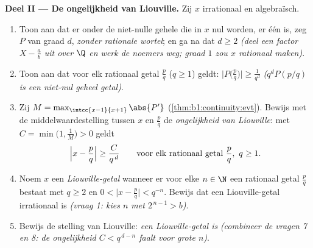 \begin{problem}
\medskip
\noindent\textbf{Deel II --- De ongelijkheid van Liouville.} Zij
$x$ irrationaal en algebraïsch.
\begin{enumerate}[resume]
  \item Toon aan dat er onder de niet-nulle gehele  die
        in $x$ nul worden, er één is, zeg $P$ van graad $d$,
        \emph{zonder rationale wortel}; en ga na dat $d \geq 2$
        \emph{(deel een factor $X - \frac ab$ uit over $\Q$ en
        werk de noemers weg; graad $1$ zou $x$ rationaal maken)}.
  \item Toon aan dat voor elk rationaal getal $\frac pq$ ($q \geq
        1$) geldt: $\bigl|P\bigl(\frac pq\bigr)\bigr| \geq
        \frac{1}{q^d}$ \emph{($q^d P(p/q)$ is een niet-nul geheel
        getal)}.
  \item Zij $M = \max_{\intcc{x-1}{x+1}} \abs{P'}$
        (\cref{thm:b1:continuity:evt}). Bewijs met de
        middelwaardestelling tussen $x$ en $\frac pq$ de
        \emph{ongelijkheid van Liouville}: met $C = \min\bigl(1,
        \frac 1M\bigr) > 0$ geldt
        \[
        \Bigl| x - \frac pq \Bigr| \geq \frac{C}{q^{\,d}}
        \qquad\text{voor elk rationaal getal } \frac pq,\ q \geq 1 .
        \]
  \item Noem $x$ een \emph{Liouville-getal} wanneer er voor elke
        $n \in \N$ een rationaal getal $\frac pq$ bestaat met $q
        \geq 2$ en $0 < \bigl|x - \frac pq\bigr| < q^{-n}$.
        Bewijs dat een Liouville-getal irrationaal is \emph{(vraag
        1: kies $n$ met $2^{\,n-1} > b$)}.
  \item Bewijs de stelling van Liouville: \emph{een
        Liouville-getal is } \emph{(combineer de
        vragen 7 en 8: de ongelijkheid $C < q^{\,d-n}$ faalt voor
        grote $n$)}.
\end{enumerate}


\end{problem}
